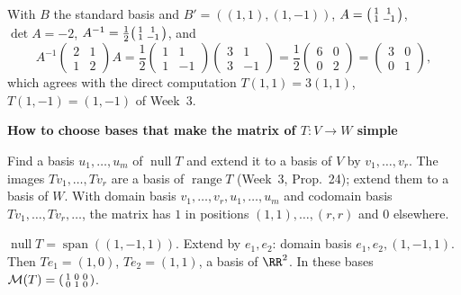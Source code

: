 \documentclass[10pt]{scrartcl}
\DeclareMathOperator{\spn}{span}\DeclareMathOperator{\nul}{null}\DeclareMathOperator{\range}{range}
\newenvironment{methodbox}[1]{\begin{mdframed}[style=methodstyle]\textbf{\color{NavyBlue}#1}\par\vspace{2pt}}{\end{mdframed}}
\begin{document}
\begin{example*}[A change of basis that diagonalizes $T(x,y)=(2x+y,x+2y)$]
  With $B$ the standard basis and $B'=((1,1),(1,-1))$, $A=\begin{psmallmatrix}1&1\\1&-1\end{psmallmatrix}$, $\det A=-2$, $A^{-1}=\tfrac12\begin{psmallmatrix}1&1\\1&-1\end{psmallmatrix}$, and
  \[
    A^{-1}\begin{pmatrix}2&1\\1&2\end{pmatrix}A=\frac12\begin{pmatrix}1&1\\1&-1\end{pmatrix}\begin{pmatrix}3&1\\3&-1\end{pmatrix}=\frac12\begin{pmatrix}6&0\\0&2\end{pmatrix}=\begin{pmatrix}3&0\\0&1\end{pmatrix},
  \]
  which agrees with the direct computation $T(1,1)=3(1,1)$, $T(1,-1)=(1,-1)$ of Week~3.
\end{example*}

\begin{methodbox}{How to choose bases that make the matrix of $T\colon V\to W$ simple}
  \begin{steps}
    \ii Find a basis $u_1,\dots,u_m$ of $\nul T$ and extend it to a basis of $V$ by $v_1,\dots,v_r$.
    \ii The images $Tv_1,\dots,Tv_r$ are a basis of $\range T$ (Week~3, Prop.~24); extend them to a basis of $W$.
    \ii With domain basis $v_1,\dots,v_r,u_1,\dots,u_m$ and codomain basis $Tv_1,\dots,Tv_r,\dots$, the matrix has $1$ in positions $(1,1),\dots,(r,r)$ and $0$ elsewhere.
  \end{steps}
\end{methodbox}

\begin{example*}[A simple matrix for $T(x,y,z)=(x+y,\ y+z)$]
  $\nul T=\spn((1,-1,1))$. Extend by $e_1,e_2$: domain basis $e_1,e_2,(1,-1,1)$. Then $Te_1=(1,0)$, $Te_2=(1,1)$, a basis of $\RR^2$. In these bases $\mathcal M(T)=\begin{psmallmatrix}1&0&0\\0&1&0\end{psmallmatrix}$.
\end{example*}
\end{document}
